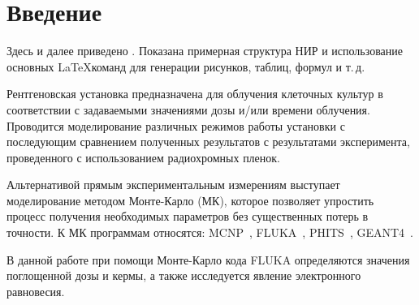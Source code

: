 % 
%

\section*{\center Введение}

Здесь и далее приведено . Показана примерная структура НИР и использование основных \LaTeX команд для генерации рисунков, таблиц, формул и т.\,д. 

Рентгеновская установка предназначена для облучения клеточных культур в соответствии с задаваемыми значениями дозы и/или времени облучения. Проводится моделирование различных режимов работы установки с последующим сравнением полученных результатов с результатами эксперимента, проведенного с использованием радиохромных пленок.

Альтернативой прямым экспериментальным измерениям выступает моделирование методом Монте-Карло (МК), которое позволяет упростить процесс получения необходимых параметров без существенных потерь в точности. К МК программам относятся: MCNP~\cite{MCNPweb}, FLUKA~\cites{Ferrari2005,Boehlen2014}, PHITS~\cite{Sato2018}, GEANT4~\cite{Agostinelli2003}. 

В данной работе при помощи Монте-Карло кода FLUKA определяются значения поглощенной дозы и кермы, а также исследуется явление электронного равновесия. 

